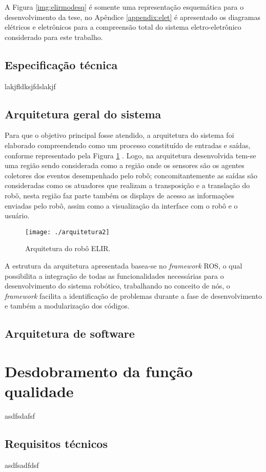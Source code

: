 A Figura \ref{img:elirmodesq} é somente uma representação esquemática para o desenvolvimento da tese, no Apêndice \ref{appendix:elet} é apresentado os diagramas elétricos e eletrônicos para a compreensão total do sistema eletro-eletrônico considerado para este trabalho.


\subsection{Especificação técnica}
\label{ssec:espt}
lakjfldksjfdslakjf

\subsection{Arquitetura geral do sistema}
\label{ssec:arqg}
Para que o objetivo principal fosse atendido, a arquitetura do sistema foi elaborado compreendendo como um processo constituído de entradas e saídas, conforme representado pela Figura \ref{img:elirarq} . Logo, na arquitetura desenvolvida tem-se uma região sendo considerada como a região onde os sensores são os agentes coletores dos eventos desempenhado pelo robô; concomitantemente as saídas são consideradas como os atuadores que realizam a transposição e a translação do robô, nesta região faz parte também os displays de acesso as informações enviadas pelo robô, assim como a visualização da interface com o robô e o usuário.

\begin{figure} [h!]	
	\caption{Arquitetura do robô ELIR.}
	\label{img:elirarq}											 
	\centering													 
	\texttt{[image: ./arquitetura2]}
\end{figure}													 



A estrutura da arquitetura apresentada basea-se no \textit{framework} ROS, o qual possibilita a integração de todas as funcionalidades necessárias para o desenvolvimento do sistema robótico, trabalhando no conceito de nós, o \textit{framework} facilita a identificação de problemas durante a fase de desenvolvimento e também a modularização dos códigos.


\subsection{Arquitetura de software}
\label{ssec:arqs}

\section{Desdobramento da função qualidade}
\label{sec:qfd}
asdfsdafsf

\subsection{Requisitos técnicos}
\label{ssec:reqt}
asdfsadfdsf


